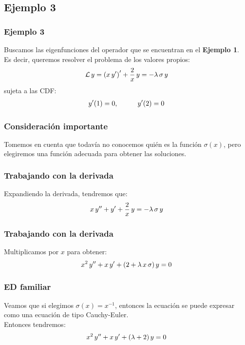 \documentclass[12pt]{beamer}
\begin{document}
\subsection*{Ejemplo 3}

\begin{frame}
\frametitle{Ejemplo 3}
Buscamos las eigenfunciones del operador que se encuentran en el \textbf{Ejemplo 1}. 
\\
\bigskip
\pause
Es decir, queremos resolver el problema de los valores propios:\
\pause
\begin{align}
\mathcal{L} \, y = \left( x \, {y}^{\prime} \right)^{\prime} + \dfrac{2}{x} \, y = - \lambda \, \sigma \, y
\label{eq:ecuacion_04_14}
\end{align}
sujeta a las CDF:
\begin{align*}
{y}^{\prime} (1) = 0, \hspace{1cm} {y}^{\prime}(2) = 0
\end{align*}
\end{frame}
\begin{frame}
\frametitle{Consideración importante}
Tomemos en cuenta que todavía no conocemos quién es la función $\sigma (x)$, pero elegiremos una función adecuada para obtener las soluciones.
\end{frame}
\begin{frame}
\frametitle{Trabajando con la derivada}
Expandiendo la derivada, tendremos que:
\pause
\begin{align*}
x \, {y}^{\prime \prime} + {y}^{\prime} + \dfrac{2}{x} \, y = - \lambda \, \sigma \, y
\end{align*}
\end{frame}
\begin{frame}
\frametitle{Trabajando con la derivada}
Multiplicamos por $x$ para obtener:
\pause
\begin{align*}
x^{2} \, {y}^{\prime \prime} + x \, {y}^{\prime} + (2 + \lambda \, x \,  \sigma) \, y = 0
\end{align*}
\end{frame}
\begin{frame}
\frametitle{ED familiar}
Veamos que si elegimos $\sigma(x) = x^{-1}$, entonces la ecuación se puede expresar como una ecuación de tipo Cauchy-Euler.
\\
\bigskip
\pause
Entonces tendremos:
\pause
\begin{align*}
x^{2} \, {y}^{\prime \prime} + x \, {y}^{\prime} + (\lambda + 2) \, y = 0
\end{align*}
\end{frame}
\end{document}
